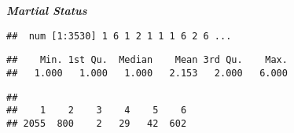 \documentclass[
]{article}
\newenvironment{Shaded}{\begin{snugshade}}{\end{snugshade}}
\newcommand{\CommentTok}[1]{\textcolor[rgb]{0.56,0.35,0.01}{\textit{#1}}}
\newcommand{\FunctionTok}[1]{\textcolor[rgb]{0.13,0.29,0.53}{\textbf{#1}}}
\newcommand{\NormalTok}[1]{#1}
\newcommand{\SpecialCharTok}[1]{\textcolor[rgb]{0.81,0.36,0.00}{\textbf{#1}}}
\begin{document}
\textbf{\emph{Martial Status}}

\begin{Shaded}
\end{Shaded}

\begin{verbatim}
##  num [1:3530] 1 6 1 2 1 1 1 6 2 6 ...
\end{verbatim}

\begin{Shaded}
\end{Shaded}

\begin{verbatim}
##    Min. 1st Qu.  Median    Mean 3rd Qu.    Max. 
##   1.000   1.000   1.000   2.153   2.000   6.000
\end{verbatim}

\begin{Shaded}
\end{Shaded}

\begin{verbatim}
## 
##    1    2    3    4    5    6 
## 2055  800    2   29   42  602
\end{verbatim}
\end{document}
